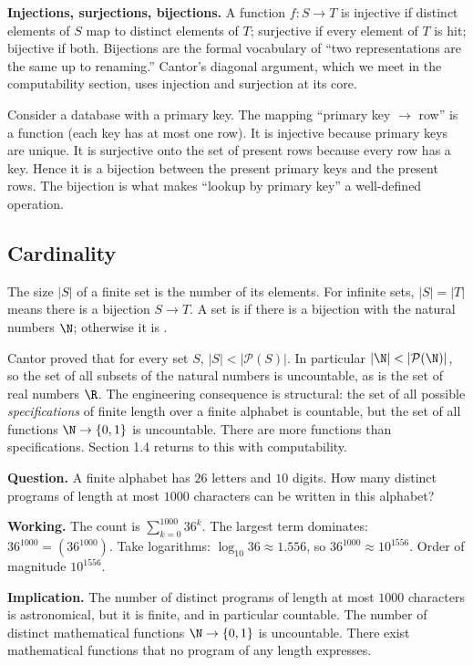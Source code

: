 \textbf{Injections, surjections, bijections.} A function $f: S \to T$ is injective if distinct elements of $S$ map to distinct elements of $T$; surjective if every element of $T$ is hit; bijective if both. Bijections are the formal vocabulary of ``two representations are the same up to renaming.'' Cantor's diagonal argument, which we meet in the computability section, uses injection and surjection at its core.

\begin{example}
Consider a database with a primary key. The mapping ``primary key $\to$ row'' is a function (each key has at most one row). It is injective because primary keys are unique. It is surjective onto the set of present rows because every row has a key. Hence it is a bijection between the present primary keys and the present rows. The bijection is what makes ``lookup by primary key'' a well-defined operation.
\end{example}

\subsection{Cardinality}

The size $|S|$ of a finite set is the number of its elements. For infinite sets, $|S| = |T|$ means there is a bijection $S \to T$. A set is  if there is a bijection with the natural numbers $\N$; otherwise it is .

Cantor proved that for every set $S$, $|S| < |\mathcal{P}(S)|$. In particular $|\N| < |\mathcal{P}(\N)|$, so the set of all subsets of the natural numbers is uncountable, as is the set of real numbers $\R$. The engineering consequence is structural: the set of all possible \emph{specifications} of finite length over a finite alphabet is countable, but the set of all functions $\N \to \{0, 1\}$ is uncountable. There are more functions than specifications. Section 1.4 returns to this with computability.

\begin{estimation}
\textbf{Question.} A finite alphabet has $26$ letters and $10$ digits. How many distinct programs of length at most $1000$ characters can be written in this alphabet?

\textbf{Working.} The count is $\sum_{k=0}^{1000} 36^k$. The largest term dominates: $36^{1000} = (36^{1000})$. Take logarithms: $\log_{10} 36 \approx 1.556$, so $36^{1000} \approx 10^{1556}$. Order of magnitude $10^{1556}$.

\textbf{Implication.} The number of distinct programs of length at most $1000$ characters is astronomical, but it is finite, and in particular countable. The number of distinct mathematical functions $\N \to \{0,1\}$ is uncountable. There exist mathematical functions that no program of any length expresses.
\end{estimation}

